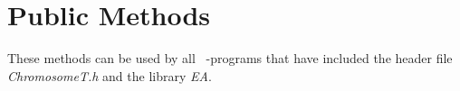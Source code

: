 \section{Public Methods}

These methods can be used by all \cpp\ -programs that have included
the header file {\em ChromosomeT.h} and the library {\em EA}.

\vspace*{4ex}


\vspace*{4ex}


\clearpage


\vspace*{4ex}


\vspace*{4ex}


\vspace*{4ex}


\clearpage


\vspace*{4ex}


\vspace*{4ex}










